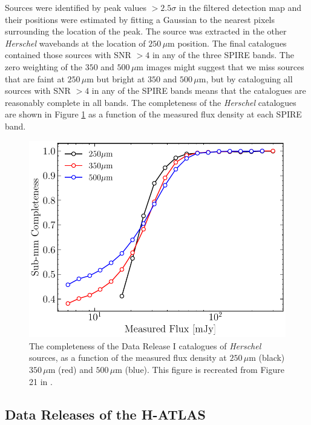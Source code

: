 Sources were identified by peak values $> 2.5\sigma$ in the filtered detection map and their positions were estimated by fitting a Gaussian to the nearest pixels surrounding the location of the peak. The source was extracted in the other \textit{Herschel} wavebands at the location of $250\,\mu$m position. The final catalogues contained those sources with SNR $> 4$ in any of the three SPIRE bands. The zero weighting of the $350$ and $500\,\mu$m images might suggest that we miss sources that are faint at $250\,\mu$m but bright at $350$ and $500\,\mu$m, but by cataloguing all sources with SNR $> 4$ in any of the SPIRE bands means that the catalogues are reasonably complete in all bands. The completeness of the \textit{Herschel} catalogues are shown in Figure \ref{fig:submm_completeness} as a function of the measured flux density at each SPIRE band.

\begin{figure}
    \centering
	\includegraphics[width=0.8\columnwidth]{Figures/submm_completeness.pdf}
	\caption[Completeness of H-ATLAS DR1 catalogue as a function of $250\,\mu$m flux]{The completeness of the Data Release I catalogues of \textit{Herschel} sources, as a function of the measured flux density at $250\,\mu$m (black) $350\,\mu$m (red) and $500\,\mu$m (blue). This figure is recreated from Figure 21 in \citealt{Valiante_2016}.}
	\label{fig:submm_completeness}
\end{figure}

\subsection{Data Releases of the H-ATLAS}
\label{sec:Data Releases of the H-ATLAS}

